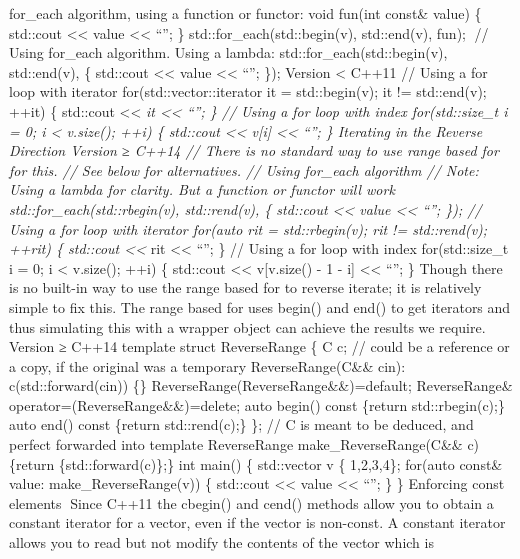 for\_each algorithm, using a function or functor: void fun(int const\&
value) \{ std::cout \textless\textless{} value \textless\textless{}
``\n''; \} std::for\_each(std::begin(v), std::end(v), fun); // Using
for\_each algorithm. Using a lambda: std::for\_each(std::begin(v),
std::end(v), \href{int\%20const\&\%20value}{} \{ std::cout
\textless\textless{} value \textless\textless{} ``\n''; \}); Version
\textless{} C++11 // Using a for loop with iterator
for(std::vector::iterator it = std::begin(v); it != std::end(v); ++it)
\{ std::cout \textless\textless{} \emph{it \textless\textless{} ``\n'';
\} // Using a for loop with index for(std::size\_t i = 0; i \textless{}
v.size(); ++i) \{ std::cout \textless\textless{} v{[}i{]}
\textless\textless{} ``\n''; \} Iterating in the Reverse Direction
Version ≥ C++14 // There is no standard way to use range based for for
this. // See below for alternatives. // Using for\_each algorithm //
Note: Using a lambda for clarity. But a function or functor will work
std::for\_each(std::rbegin(v), std::rend(v),
\href{auto\%20const\&\%20value}{} \{ std::cout \textless\textless{}
value \textless\textless{} ``\n''; \}); // Using a for loop with
iterator for(auto rit = std::rbegin(v); rit != std::rend(v); ++rit) \{
std::cout \textless\textless{} }rit \textless\textless{} ``\n''; \} //
Using a for loop with index for(std::size\_t i = 0; i \textless{}
v.size(); ++i) \{ std::cout \textless\textless{} v{[}v.size() - 1 - i{]}
\textless\textless{} ``\n''; \} Though there is no built-in way to use
the range based for to reverse iterate; it is relatively simple to ﬁx
this. The range based for uses begin() and end() to get iterators and
thus simulating this with a wrapper object can achieve the results we
require. Version ≥ C++14 template struct ReverseRange \{ C c; // could
be a reference or a copy, if the original was a temporary
ReverseRange(C\&\& cin): c(std::forward(cin)) \{\}
ReverseRange(ReverseRange\&\&)=default; ReverseRange\&
operator=(ReverseRange\&\&)=delete; auto begin() const \{return
std::rbegin(c);\} auto end() const \{return std::rend(c);\} \}; // C is
meant to be deduced, and perfect forwarded into template ReverseRange
make\_ReverseRange(C\&\& c) \{return \{std::forward(c)\};\} int main()
\{ std::vector v \{ 1,2,3,4\}; for(auto const\& value:
make\_ReverseRange(v)) \{ std::cout \textless\textless{} value
\textless\textless{} ``\n''; \} \} Enforcing const elements Since C++11
the cbegin() and cend() methods allow you to obtain a constant iterator
for a vector, even if the vector is non-const. A constant iterator
allows you to read but not modify the contents of the vector which is

